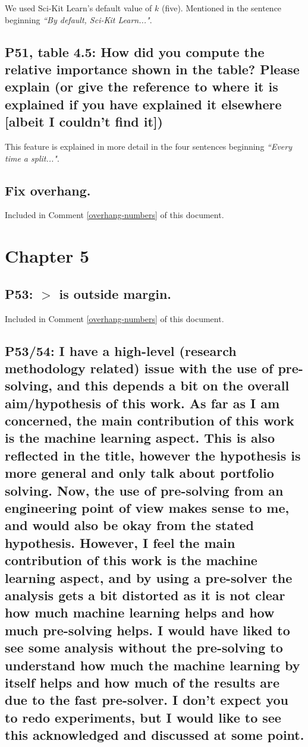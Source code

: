 \documentclass[]{article}
\begin{document}
We used Sci-Kit Learn's default value of $k$ (five). Mentioned in the sentence beginning \emph{``By default, Sci-Kit Learn..."}.

\subsection{P51, table 4.5: How did you compute the relative importance shown in the table? Please explain (or give the reference to where it is explained if you have explained it elsewhere [albeit I couldn't find it])}

This feature is explained in more detail in the four sentences beginning \emph{``Every time a split..."}.

\subsection{Fix overhang.}

Included in Comment \ref{overhang-numbers} of this document.

\section{Chapter 5}

\subsection{P53: $>$ is outside margin.}

Included in Comment \ref{overhang-numbers} of this document.

\subsection{P53/54: I have a high-level (research methodology related) issue with the use of pre-solving, and this depends a bit on the overall aim/hypothesis of this work. As far as I am concerned, the main contribution of this work is the machine learning aspect. This is also reflected in the title, however the hypothesis is more general and only talk about portfolio solving. Now, the use of pre-solving from an engineering point of view makes sense to me, and would also be okay from the stated hypothesis. However, I feel the main contribution of this work is the machine learning aspect, and by using a pre-solver the analysis gets a bit distorted as it is not clear how much machine learning helps and how much pre-solving helps. I would have liked to see some analysis without the pre-solving to understand how much the machine learning by itself helps and how much of the results are due to the fast pre-solver. I don't expect you to redo experiments, but I would like to see this acknowledged and discussed at some point.}
\end{document}
